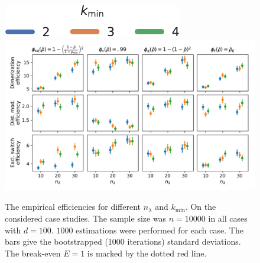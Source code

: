 \begin{figure}[htb]
  \centering
  \includegraphics[scale=.55]{gfx/legend_horiz.pdf}\\
  \includegraphics[scale=.4]{gfx/efficiency_pminfrac.pdf}
  \caption[Varying redundancy heuristics and $k_{\min}$]{The
    empirical efficiencies for different $n_\lambda$ and $k_{\min}$.
    On the considered case studies. The sample size was
    $n=\num{10000}$ in all cases
    with $d=100$.
    $\num{1000}$ estimations were performed for each case.
    The bars give the
    bootstrapped (\num{1000} iterations) standard deviations.
    The break-even $E=1$ is marked by the dotted red
  line.\label{fig:efficiencies_alg_params}}
\end{figure}

